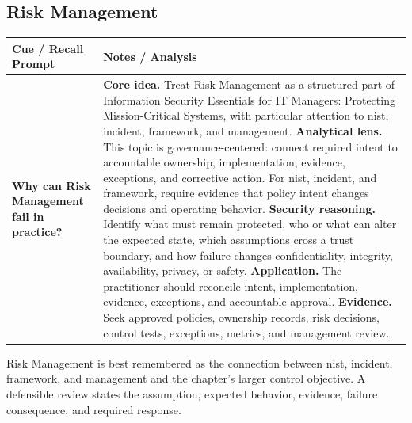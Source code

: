 \documentclass[11pt]{article}
\newcommand{\CornellHeader}{%
\rowcolor{Navy}\color{white}\bfseries Cue / Recall Prompt & \color{white}\bfseries Notes / Analysis\\\hline}
\newcommand{\CornellRow}[2]{%
\cellcolor{CueGray}\RaggedRight\textbf{#1} & \RaggedRight #2\\\hline}
\begin{document}
\subsection*{Risk Management}
\begin{longtable}{>{\RaggedRight\arraybackslash}p{}|>{\RaggedRight\arraybackslash}p{}}
\CornellHeader
\CornellRow{Why can Risk Management fail in practice?}{\textbf{Core idea.} Treat Risk Management as a structured part of Information Security Essentials for IT Managers: Protecting Mission-Critical Systems, with particular attention to nist, incident, framework, and management. \textbf{Analytical lens.} This topic is governance-centered: connect required intent to accountable ownership, implementation, evidence, exceptions, and corrective action. For nist, incident, and framework, require evidence that policy intent changes decisions and operating behavior. \textbf{Security reasoning.} Identify what must remain protected, who or what can alter the expected state, which assumptions cross a trust boundary, and how failure changes confidentiality, integrity, availability, privacy, or safety. \textbf{Application.} The practitioner should reconcile intent, implementation, evidence, exceptions, and accountable approval. \textbf{Evidence.} Seek approved policies, ownership records, risk decisions, control tests, exceptions, metrics, and management review.}
\end{longtable}
\begin{topicsummary}
Risk Management is best remembered as the connection between nist, incident, framework, and management and the chapter's larger control objective. A defensible review states the assumption, expected behavior, evidence, failure consequence, and required response.
\end{topicsummary}
\end{document}
